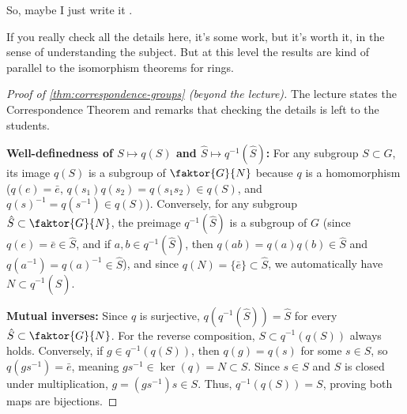 \begin{speech}[00:18:22 - 00:18:54]
So, maybe I just write it .

If you really check all the details here, it's some work, but it's worth it, in the sense of understanding the subject. But at this level the results are kind of parallel to the isomorphism theorems for rings.
\end{speech}

\begin{content}

\begin{proof}[Proof of \cref{thm:correspondence-groups} (beyond the lecture)]
The lecture states the Correspondence Theorem and remarks that checking the details is left to the students.

\textbf{Well-definedness of $S \mapsto q(S)$ and $\hat{S} \mapsto q^{-1}(\hat{S})$:}
For any subgroup $S \subset G$, its image $q(S)$ is a subgroup of $\faktor{G}{N}$ because $q$ is a homomorphism ($q(e) = \bar{e}$, $q(s_1)q(s_2) = q(s_1 s_2) \in q(S)$, and $q(s)^{-1} = q(s^{-1}) \in q(S)$). Conversely, for any subgroup $\hat{S} \subset \faktor{G}{N}$, the preimage $q^{-1}(\hat{S})$ is a subgroup of $G$ (since $q(e) = \bar{e} \in \hat{S}$, and if $a, b \in q^{-1}(\hat{S})$, then $q(ab) = q(a)q(b) \in \hat{S}$ and $q(a^{-1}) = q(a)^{-1} \in \hat{S}$), and since $q(N) = \{\bar{e}\} \subset \hat{S}$, we automatically have $N \subset q^{-1}(\hat{S})$.

\textbf{Mutual inverses:}
Since $q$ is surjective, $q(q^{-1}(\hat{S})) = \hat{S}$ for every $\hat{S} \subset \faktor{G}{N}$. For the reverse composition, $S \subset q^{-1}(q(S))$ always holds. Conversely, if $g \in q^{-1}(q(S))$, then $q(g) = q(s)$ for some $s \in S$, so $q(g s^{-1}) = \bar{e}$, meaning $g s^{-1} \in \ker(q) = N \subset S$. Since $s \in S$ and $S$ is closed under multiplication, $g = (g s^{-1}) s \in S$. Thus, $q^{-1}(q(S)) = S$, proving both maps are bijections.


\end{proof}
\end{content}
